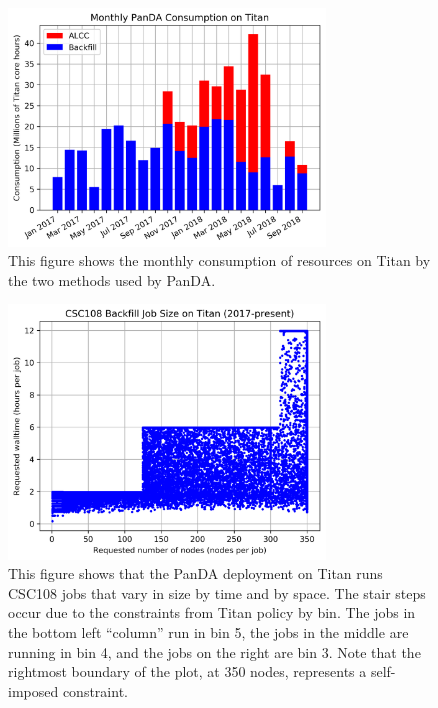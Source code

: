 \begin{figure}
  \includegraphics[width=0.75\textwidth]{images/monthly-consumption.png}
\caption{This figure shows the monthly consumption of resources on Titan by the
two methods used by PanDA.}
\label{fig:monthly-consumption}
\end{figure}



\begin{figure}
  \includegraphics[width=0.75\textwidth]{images/time-vs-nodes-backfill.png}
\caption{This figure shows that the PanDA deployment on Titan runs CSC108 jobs
that vary in size by time and by space. The stair steps occur due to the
constraints from Titan policy by bin. The jobs in the bottom left ``column''
run in bin 5, the jobs in the middle are running in bin 4, and the jobs on the
right are bin 3. Note that the rightmost boundary of the plot, at 350 nodes,
represents a self-imposed constraint.}
\label{fig:time-vs-nodes}
\end{figure}


